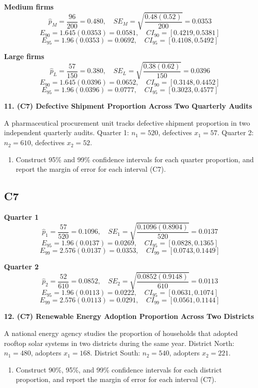 \begin{ExamProblems}
		\textbf{Medium firms}
		\[
		\hat{p}_M=\frac{96}{200}=0.480,
		\quad SE_M=\sqrt{\frac{0.48(0.52)}{200}}=0.0353
		\]
		\[
		E_{90}=1.645(0.0353)=0.0581,\quad CI_{90}=[0.4219,0.5381]
		\]
		\[
		E_{95}=1.96(0.0353)=0.0692,\quad CI_{95}=[0.4108,0.5492]
		\]
		
		\textbf{Large firms}
		\[
		\hat{p}_L=\frac{57}{150}=0.380,
		\quad SE_L=\sqrt{\frac{0.38(0.62)}{150}}=0.0396
		\]
		\[
		E_{90}=1.645(0.0396)=0.0652,\quad CI_{90}=[0.3148,0.4452]
		\]
		\[
		E_{95}=1.96(0.0396)=0.0777,\quad CI_{95}=[0.3023,0.4577]
		\]
		
		\newpage
		\item
		\textbf{11. (C7) Defective Shipment Proportion Across Two Quarterly Audits}
		
		A pharmaceutical procurement unit tracks defective shipment proportion in two independent quarterly audits.
		Quarter 1: $n_1=520$, defectives $x_1=57$.
		Quarter 2: $n_2=610$, defectives $x_2=52$.
		\begin{enumerate}
			\item Construct 95\% and 99\% confidence intervals for each quarter proportion, and report the margin of error for each interval (C7).
		\end{enumerate}
		
		\subsection*{C7}
		\textbf{Quarter 1}
		\[
		\hat{p}_1=\frac{57}{520}=0.1096,
		\quad SE_1=\sqrt{\frac{0.1096(0.8904)}{520}}=0.0137
		\]
		\[
		E_{95}=1.96(0.0137)=0.0269,\quad CI_{95}=[0.0828,0.1365]
		\]
		\[
		E_{99}=2.576(0.0137)=0.0353,\quad CI_{99}=[0.0743,0.1449]
		\]
		
		\textbf{Quarter 2}
		\[
		\hat{p}_2=\frac{52}{610}=0.0852,
		\quad SE_2=\sqrt{\frac{0.0852(0.9148)}{610}}=0.0113
		\]
		\[
		E_{95}=1.96(0.0113)=0.0222,\quad CI_{95}=[0.0631,0.1074]
		\]
		\[
		E_{99}=2.576(0.0113)=0.0291,\quad CI_{99}=[0.0561,0.1144]
		\]
		
		\newpage
		\item
		\textbf{12. (C7) Renewable Energy Adoption Proportion Across Two Districts}
		
		A national energy agency studies the proportion of households that adopted rooftop solar systems in two districts during the same year.
		District North: $n_1=480$, adopters $x_1=168$.
		District South: $n_2=540$, adopters $x_2=221$.
		\begin{enumerate}
			\item Construct 90\%, 95\%, and 99\% confidence intervals for each district proportion, and report the margin of error for each interval (C7).
		\end{enumerate}
		

\end{ExamProblems}

